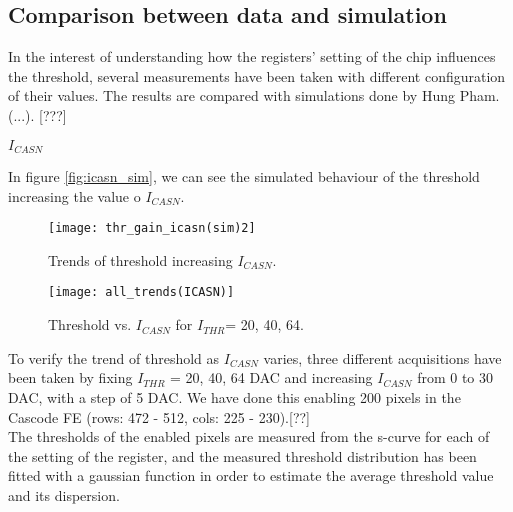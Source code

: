 \begin{comment}
pag.97 tesi
This modification has significant consequences in several design aspects such as the bandwidth, gain, noise and threshold dispersion resulting in a different front-end behavior
\end{comment}


\subsection{Comparison between data and simulation}

In the interest of understanding how the registers' setting of the chip influences the threshold, several measurements have been taken with different configuration of their values.
The results are compared with simulations done by Hung Pham.  (...). [???]

\begin{description}
\item[\textbf{$I_{CASN}$}] 
\end{description}

In figure \autoref{fig:icasn_sim}, we can see the simulated behaviour of the threshold increasing the value o $I_{CASN}$.

\begin{figure}[h!]
\centering
\texttt{[image: thr\_gain\_icasn(sim)2]}
\caption{Trends of threshold increasing $I_{CASN}$.}
\label{fig:icasn_sim}
\end{figure}

\begin{figure}[h!]
\centering
\texttt{[image: all\_trends(ICASN)]}
\caption{Threshold vs. $I_{CASN}$ for $I_{THR}$= 20, 40, 64.}
\label{fig:alltrends_icasn}
\end{figure}

To verify the trend of threshold as $I_{CASN}$ varies, three different acquisitions have been taken by fixing $I_{THR}$ = 20, 40, 64 DAC and increasing $I_{CASN}$ from 0 to 30 DAC, with a step of 5 DAC. We have done this enabling 200 pixels in the Cascode FE (rows: 472 - 512, cols: 225 - 230).[??]\\

The thresholds of the enabled pixels are measured from the s-curve for each of the setting of the register, and the measured threshold distribution has been fitted with a gaussian function in order to estimate the average threshold value and its dispersion.

